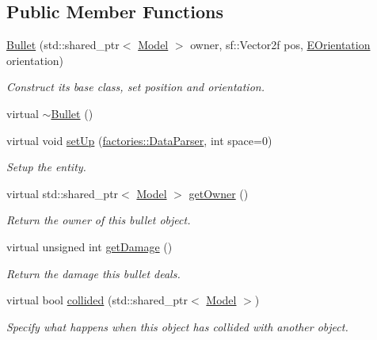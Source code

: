 \subsection*{\-Public \-Member \-Functions}
\begin{DoxyCompactItemize}
\item 
\hyperlink{classmodels_1_1Bullet_a7b2bb4b533e13f58b9dac3b7c5afd379}{\-Bullet} (std\-::shared\-\_\-ptr$<$ \hyperlink{classmodels_1_1Model}{\-Model} $>$ owner, sf\-::\-Vector2f pos, \hyperlink{namespacemodels_adec64ede5178a8b8fed882b3790d423d}{\-E\-Orientation} orientation)
\begin{DoxyCompactList}\small\item\em \-Construct its base class, set position and orientation. \end{DoxyCompactList}\item 
virtual \hyperlink{classmodels_1_1Bullet_abc9b06c44a0c89111c448727aae04f88}{$\sim$\-Bullet} ()
\item 
virtual void \hyperlink{classmodels_1_1Bullet_a72304e5742e10d6eed1ee71ede9c8281}{set\-Up} (\hyperlink{classfactories_1_1DataParser}{factories\-::\-Data\-Parser}, int space=0)
\begin{DoxyCompactList}\small\item\em \-Setup the entity. \end{DoxyCompactList}\item 
virtual std\-::shared\-\_\-ptr$<$ \hyperlink{classmodels_1_1Model}{\-Model} $>$ \hyperlink{classmodels_1_1Bullet_a85bdcde6c229ca15331b31b41d857c74}{get\-Owner} ()
\begin{DoxyCompactList}\small\item\em \-Return the owner of this bullet object. \end{DoxyCompactList}\item 
virtual unsigned int \hyperlink{classmodels_1_1Bullet_a6758e5f6e995947136edec2d99dacbb7}{get\-Damage} ()
\begin{DoxyCompactList}\small\item\em \-Return the damage this bullet deals. \end{DoxyCompactList}\item 
virtual bool \hyperlink{classmodels_1_1Bullet_ac6cf8da945be2c61d75a50772ff1898d}{collided} (std\-::shared\-\_\-ptr$<$ \hyperlink{classmodels_1_1Model}{\-Model} $>$)
\begin{DoxyCompactList}\small\item\em \-Specify what happens when this object has collided with another object. \end{DoxyCompactList}\end{DoxyCompactItemize}
